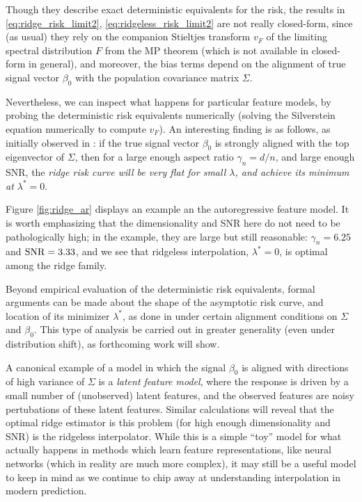 \documentclass{article}
\begin{document}
Though they describe exact deterministic equivalents for the risk, the results
in \eqref{eq:ridge_risk_limit2}, \eqref{eq:ridgeless_risk_limit2} are not really 
closed-form, since (as usual) they rely on the companion Stieltjes transform
$v_F$ of the limiting spectral distribution $F$ from the MP theorem (which is
not available in closed-form in general), and moreover, the bias terms depend on
the alignment of true signal vector $\beta_0$ with the population covariance
matrix $\Sigma$.  

Nevertheless, we can inspect what happens for particular feature models, by 
probing the deterministic risk equivalents numerically (solving the Silverstein 
equation numerically to compute $v_F$). An interesting finding is as follows, as 
initially observed in \citet{kobak2020optimal}: if the true signal vector
$\beta_0$ is strongly aligned with the top eigenvector of $\Sigma$, then for a
large enough aspect ratio $\gamma_n = d/n$, and large enough SNR, the
\emph{ridge risk curve will be very flat for small $\lambda$, and achieve its
  minimum at $\lambda^* = 0$}. 

Figure \ref{fig:ridge_ar} displays an example an the autoregressive feature 
model. It is worth emphasizing that the dimensionality and SNR here do not need
to be pathologically high; in the example, they are large but still reasonable:
$\gamma_n = 6.25$ and $\mathrm{SNR} = 3.33$, and we see that ridgeless interpolation,
$\lambda^* = 0$, is optimal among the ridge family.     

Beyond empirical evaluation of the deterministic risk equivalents, formal
arguments can be made about the shape of the asymptotic risk curve, and location
of its minimizer $\lambda^*$, as done in \citet{wu2020optimal,
  richards2021asymptotics} under certain alignment conditions on $\Sigma$ and
$\beta_0$. This type of analysis be carried out in greater generality (even
under distribution shift), as forthcoming work will show. 

A canonical example of a model in which the signal $\beta_0$ is aligned with
directions of high variance of $\Sigma$ is a \emph{latent feature model}, where
the response is driven by a small number of (unobserved) latent features, and
the observed features are noisy pertubations of these latent features. Similar
calculations will reveal that the optimal ridge estimator is this problem (for
high enough dimensionality and SNR) is the ridgeless interpolator. While this is
a simple ``toy'' model for what actually happens in methods which learn feature  
representations, like neural networks (which in reality are much more complex),
it may still be a useful model to keep in mind as we continue to chip away at
understanding interpolation in modern prediction.    
\end{document}
